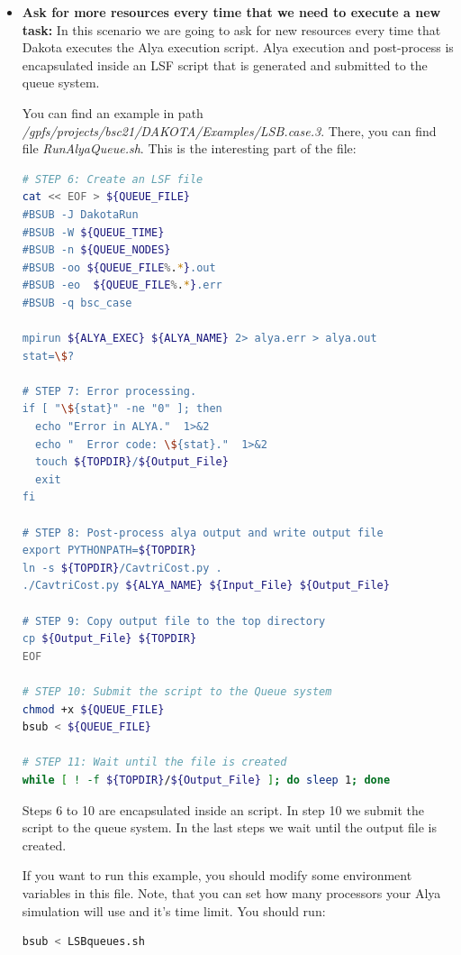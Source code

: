 \documentclass[12pt,a4paper,article]{memoir}
\begin{document}
\begin{itemize}
\item \textbf{Ask for more resources every time that we need to execute a new task:} In this scenario we are going to ask for new resources every time that Dakota executes the Alya execution script. Alya execution and post-process is encapsulated inside an LSF script that is generated and submitted to the queue system.

You can find an example in path \textit{/gpfs/projects/bsc21/DAKOTA/Examples/LSB.case.3}. There, you can find file \textit{RunAlyaQueue.sh}. This is the interesting part of the file:

\begin{lstlisting}[style=MyCodeStyle,language=bash]
# STEP 6: Create an LSF file
cat << EOF > ${QUEUE_FILE}
#BSUB -J DakotaRun 
#BSUB -W ${QUEUE_TIME}
#BSUB -n ${QUEUE_NODES}
#BSUB -oo ${QUEUE_FILE%.*}.out
#BSUB -eo  ${QUEUE_FILE%.*}.err
#BSUB -q bsc_case

mpirun ${ALYA_EXEC} ${ALYA_NAME} 2> alya.err > alya.out
stat=\$?

# STEP 7: Error processing.
if [ "\${stat}" -ne "0" ]; then
  echo "Error in ALYA."  1>&2
  echo "  Error code: \${stat}."  1>&2
  touch ${TOPDIR}/${Output_File}
  exit
fi

# STEP 8: Post-process alya output and write output file
export PYTHONPATH=${TOPDIR}
ln -s ${TOPDIR}/CavtriCost.py .
./CavtriCost.py ${ALYA_NAME} ${Input_File} ${Output_File}

# STEP 9: Copy output file to the top directory
cp ${Output_File} ${TOPDIR}
EOF

# STEP 10: Submit the script to the Queue system
chmod +x ${QUEUE_FILE}
bsub < ${QUEUE_FILE}

# STEP 11: Wait until the file is created
while [ ! -f ${TOPDIR}/${Output_File} ]; do sleep 1; done
\end{lstlisting}

Steps 6 to 10 are encapsulated inside an script. In step 10 we submit the script to the queue system. In the last steps we wait until the  output file is created.

If you want to run this example, you should modify some environment variables in this file. Note, that you can set how many processors your Alya simulation will use and it's time limit. You should run:
\begin{lstlisting}[style=MyCodeStyle,language=bash]
bsub < LSBqueues.sh
\end{lstlisting}

\end{itemize}
 
\end{document}
